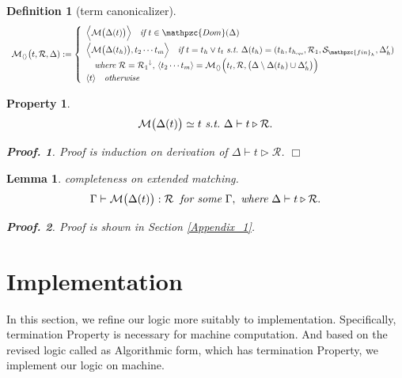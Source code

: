 \documentclass[12pt]{article}
\newtheorem{Definition}{Definition}[section]
\newtheorem{Property}{Property}[section]
\newtheorem{Lemma}{Lemma}[section]
\newtheorem{Proof}{Proof.}
\begin{document}
\begin{Definition}[term canonicalizer]
\begin{displaymath}
\begin{array}{l}
     \mathcal{M}_{\langle\rangle}\bigl(t, \mathcal{R},\Delta) :=
     \left\{\begin{array}{l}
       \Bigl\langle\mathcal{M}\bigl(\Delta(t) \bigr) \Bigr\rangle
        \quad \text{\it if}\ t \in \mathpzc{Dom}(\Delta)  \\ [5pt]
       \Bigl\langle\mathcal{M}\bigl(\Delta(t_h) \bigr), t_2 \cdots t_m
        \Bigr\rangle \quad \text{\it if}\ t = t_h \vee t_t\ \text{\it s.t.}\
         \Delta(t_h) = (t_h, t_{h_{\text{\it equ}}}, \mathcal{R}_1,
          \mathcal{S}_{\mathpzc{fin}_h}, \Delta'_h)  \\
       \quad \text{\it where}\ \mathcal{R} = {\mathcal{R}_1}^\downarrow,\,
        \langle t_2 \cdots t_m\rangle =
         \mathcal{M}_{\langle\rangle}\Bigl(t_t, \mathcal{R}, \bigl(
          \Delta \setminus \Delta(t_h) \cup \Delta'_h \bigr) \Bigr)  \\
       \langle t \rangle \quad \text{\it otherwise}
     \end{array}\right.
    \end{array}
  \end{displaymath}
\end{Definition}


\begin{Property}
  \label{equality_over_transduction}
  \[ \mathcal{M}\bigl(\Delta(t) \bigr) \simeq t\ \text{\it s.t.}\
      \Delta \vdash t \triangleright \mathcal{R}.
  \]
  \begin{Proof}
    Proof is induction on derivation of
    $\Delta \vdash t \triangleright \mathcal{R}$.
    $\Box$
  \end{Proof}
\end{Property}


\begin{Lemma}{completeness on extended matching.}
  \label{completeness_on_extended_matching}
  \[ \Gamma \vdash \mathcal{M}\bigl( \Delta(t) \bigr) : \mathcal{R}\;\;
      \text{\it for some}\ \Gamma,\ \text{\it where}\
       \Delta \vdash t \triangleright \mathcal{R}.
  \]
  \begin{Proof}
    Proof is shown in Section \ref{Appendix_1}.
  \end{Proof}
\end{Lemma}


\pagebreak
\section{Implementation}

In this section, we refine our logic more suitably to implementation.
Specifically, termination Property is necessary for machine computation.
And based on the revised logic called as Algorithmic form, which has
termination Property, we implement our logic on machine.
\end{document}
